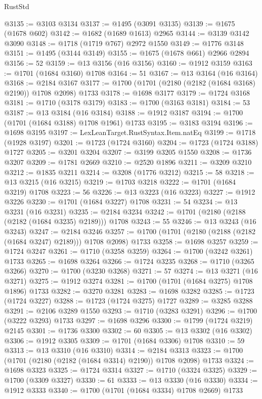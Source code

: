 \begin{lexlean}{RustStd}
\begin{coremodule}
@3135 := @3103 @3134
@3137 := @1495 (@3091 @3135)
@3139 := @1675 (@1678 @602)
@3142 := @1682 (@1689 @1613) @2965
@3144 := @3139 @3142 @3090
@3148 := @1718 (@1719 @767) @2972 @1550
@3149 := @1776 @3148
@3151 := @1495 (@3144 @3149)
@3155 := @1675 (@1678 @661) @2966 @2894
@3156 := 52
@3159 := @13 @3156 (@16 @3156)
@3160 := @1912 @3159
@3163 := @1701 (@1684 @3160) @1708
@3164 := 51
@3167 := @13 @3164 (@16 @3164)
@3168 := @2184 @3167
@3177 := @1700 (@1701 (@2180 (@2182 (@1684 @3168) @2190)) @1708 @2098) @1733
@3178 := @1698 @3177
@3179 := @1724 @3168
@3181 := @1710 (@3178 @3179)
@3183 := @1700 (@3163 @3181)
@3184 := 53
@3187 := @13 @3184 (@16 @3184)
@3188 := @1912 @3187
@3194 := @1700 (@1701 (@1684 @3188) @1708 @1961) @1733
@3195 := @3183 @3194
@3196 := @1698 @3195
@3197 := LexLeanTarget.RustSyntax.Item.natEq
@3199 := @1718 (@1928 @3197)
@3201 := @1723 (@1724 @3160)
@3204 := @1723 (@1724 @3188) @1727
@3205 := @3201 @3204
@3207 := @3199 @3205 @1550
@3208 := @1736 @3207
@3209 := @1781 @2669
@3210 := @2520 @1896
@3211 := @3209 @3210
@3212 := @1835 @3211
@3214 := @3208 (@1776 @3212)
@3215 := 58
@3218 := @13 @3215 (@16 @3215)
@3219 := @1703 @3218
@3222 := @1701 (@1684 @3219) @1708
@3223 := 56
@3226 := @13 @3223 (@16 @3223)
@3227 := @1912 @3226
@3230 := @1701 (@1684 @3227) @1708
@3231 := 54
@3234 := @13 @3231 (@16 @3231)
@3235 := @2184 @3234
@3242 := @1701 (@2180 (@2188 (@2182 (@1684 @3235) @2189))) @1708
@3243 := 55
@3246 := @13 @3243 (@16 @3243)
@3247 := @2184 @3246
@3257 := @1700 (@1701 (@2180 (@2188 (@2182 (@1684 @3247) @2189))) @1708 @2098) @1733
@3258 := @1698 @3257
@3259 := @1724 @3247
@3261 := @1710 (@3258 @3259)
@3264 := @1700 (@3242 @3261) @1733
@3265 := @1698 @3264
@3266 := @1724 @3235
@3268 := @1710 (@3265 @3266)
@3270 := @1700 (@3230 @3268)
@3271 := 57
@3274 := @13 @3271 (@16 @3271)
@3275 := @1912 @3274
@3281 := @1700 (@1701 (@1684 @3275) @1708 @1896) @1733
@3282 := @3270 @3281
@3283 := @1698 @3282
@3285 := @1723 (@1724 @3227)
@3288 := @1723 (@1724 @3275) @1727
@3289 := @3285 @3288
@3291 := @2106 @3289 @1550
@3293 := @1710 (@3283 @3291)
@3296 := @1700 (@3222 @3293) @1733
@3297 := @1698 @3296
@3300 := @1799 (@1724 @3219) @2145
@3301 := @1736 @3300
@3302 := 60
@3305 := @13 @3302 (@16 @3302)
@3306 := @1912 @3305
@3309 := @1701 (@1684 @3306) @1708
@3310 := 59
@3313 := @13 @3310 (@16 @3310)
@3314 := @2184 @3313
@3323 := @1700 (@1701 (@2180 (@2182 (@1684 @3314) @2190)) @1708 @2098) @1733
@3324 := @1698 @3323
@3325 := @1724 @3314
@3327 := @1710 (@3324 @3325)
@3329 := @1700 (@3309 @3327)
@3330 := 61
@3333 := @13 @3330 (@16 @3330)
@3334 := @1912 @3333
@3340 := @1700 (@1701 (@1684 @3334) @1708 @2669) @1733

\end{coremodule}
\end{lexlean}

